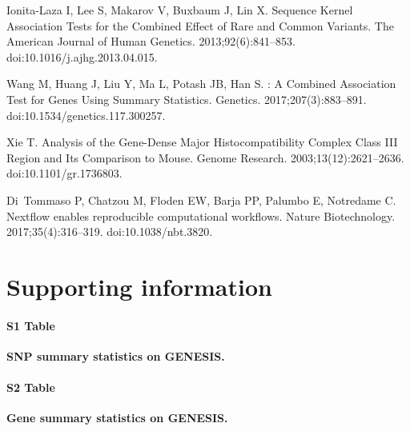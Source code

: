 \documentclass[10pt,letterpaper]{article}
\begin{document}
\begin{thebibliography}{10}
  Ionita-Laza I, Lee S, Makarov V, Buxbaum J, Lin X.
  \newblock Sequence {Kernel} {Association} {Tests} for the {Combined} {Effect}
    of {Rare} and {Common} {Variants}.
  \newblock The American Journal of Human Genetics. 2013;92(6):841--853.
  \newblock doi:{10.1016/j.ajhg.2013.04.015}.
  
  Wang M, Huang J, Liu Y, Ma L, Potash JB, Han S.
  : {A} {Combined} {Association} {Test} for {Genes} {Using}
    {Summary} {Statistics}.
  \newblock Genetics. 2017;207(3):883--891.
  \newblock doi:{10.1534/genetics.117.300257}.
  
  Xie T.
  \newblock Analysis of the Gene-Dense Major Histocompatibility Complex Class
    {III} Region and Its Comparison to Mouse.
  \newblock Genome Research. 2003;13(12):2621--2636.
  \newblock doi:{10.1101/gr.1736803}.
  
  Di~Tommaso P, Chatzou M, Floden EW, Barja PP, Palumbo E, Notredame C.
  \newblock Nextflow enables reproducible computational workflows.
  \newblock Nature Biotechnology. 2017;35(4):316--319.
  \newblock doi:{10.1038/nbt.3820}.
  
  \end{thebibliography}


%
%
% 

\section{Supporting information}

\paragraph*{S1 Table}
\label{stab:snp_summary}
\textbf{SNP summary statistics on GENESIS.}

\paragraph*{S2 Table}
\label{stab:gene_summary}
\textbf{Gene summary statistics on GENESIS.}
\end{document}
